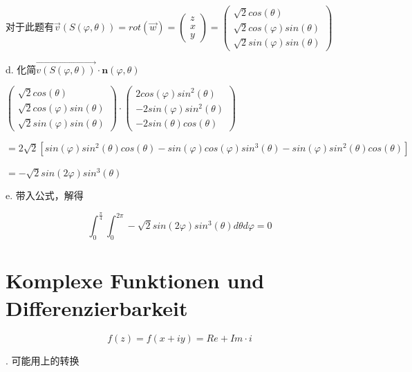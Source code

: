 \documentclass[fleqn]{article}
\begin{document}
\qquad 对于此题有$\vec{v}(S(\varphi,\theta))=rot(\vec{w})=\begin{pmatrix}
    z\\x\\y
\end{pmatrix}=\begin{pmatrix}
    \sqrt{2}cos(\theta)\\\sqrt{2}cos(\varphi)sin(\theta)\\\sqrt{2}sin(\varphi)sin(\theta)
\end{pmatrix}$

d. 化简$\vec{v(S(\varphi,\theta))}\cdot \pmb{n}(\varphi,\theta)$

$\begin{pmatrix}
    \sqrt{2}cos(\theta)\\\sqrt{2}cos(\varphi)sin(\theta)\\\sqrt{2}sin(\varphi)sin(\theta)
\end{pmatrix}\cdot \begin{pmatrix}
    2cos(\varphi)sin^2(\theta)\\-2sin(\varphi)sin^2(\theta)\\-2sin(\theta)cos(\theta)
\end{pmatrix}$

$=2\sqrt{2}[sin(\varphi)sin^2(\theta)cos(\theta)-sin(\varphi)cos(\varphi)sin^3(\theta)-sin(\varphi)sin^2(\theta)cos(\theta)]$

$=-\sqrt{2}sin(2\varphi)sin^3(\theta)$

e. 带入公式，解得

$$\int_0^{\frac{\pi}{4}}\int_0^{2\pi}-\sqrt{2}sin(2\varphi)sin^3(\theta)d\theta d\varphi = 0$$

\clearpage
\section{Komplexe Funktionen und Differenzierbarkeit}

$$f(z)=f(x+iy)=Re+Im\cdot i$$

. 可能用上的转换
\end{document}

